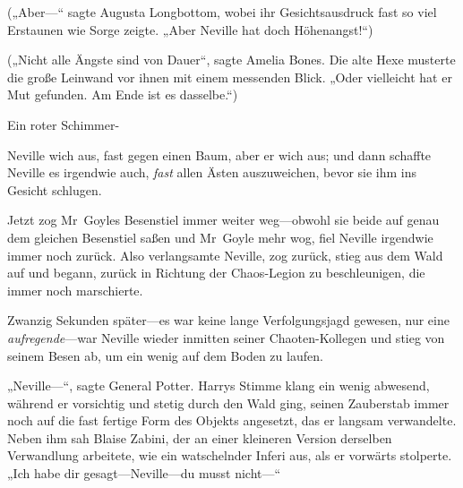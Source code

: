 („Aber—“ sagte Augusta Longbottom, wobei ihr Gesichtsausdruck fast so viel Erstaunen wie Sorge zeigte. „Aber Neville hat doch Höhenangst!“)

(„Nicht alle Ängste sind von Dauer“, sagte Amelia Bones. Die alte Hexe musterte die große Leinwand vor ihnen mit einem messenden Blick. „Oder vielleicht hat er Mut gefunden. Am Ende ist es dasselbe.“)

Ein roter Schimmer-

Neville wich aus, fast gegen einen Baum, aber er wich aus; und dann schaffte Neville es irgendwie auch, \emph{fast} allen Ästen auszuweichen, bevor sie ihm ins Gesicht schlugen.

Jetzt zog Mr~Goyles Besenstiel immer weiter weg—obwohl sie beide auf genau dem gleichen Besenstiel saßen und Mr~Goyle mehr wog, fiel Neville irgendwie immer noch zurück. Also verlangsamte Neville, zog zurück, stieg aus dem Wald auf und begann, zurück in Richtung der Chaos-Legion zu beschleunigen, die immer noch marschierte.

Zwanzig Sekunden später—es war keine lange Verfolgungsjagd gewesen, nur eine \emph{aufregende}—war Neville wieder inmitten seiner Chaoten-Kollegen und stieg von seinem Besen ab, um ein wenig auf dem Boden zu laufen.

„Neville—“, sagte General Potter. Harrys Stimme klang ein wenig abwesend, während er vorsichtig und stetig durch den Wald ging, seinen Zauberstab immer noch auf die fast fertige Form des Objekts angesetzt, das er langsam verwandelte. Neben ihm sah Blaise Zabini, der an einer kleineren Version derselben Verwandlung arbeitete, wie ein watschelnder Inferi aus, als er vorwärts stolperte. „Ich habe dir gesagt—Neville—du musst nicht—“

